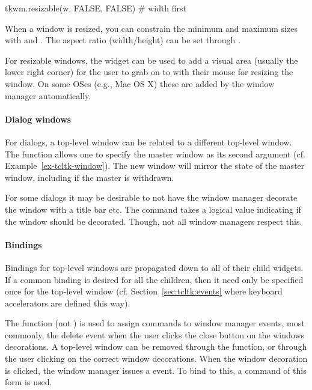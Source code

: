 \begin{Schunk}
  \begin{Sinput}
tkwm.resizable(w, FALSE, FALSE)    # width first
  \end{Sinput}
\end{Schunk}
%
When a window is resized, you can constrain the minimum and maximum
sizes with  and . The
aspect ratio (width/height) can be set through .


For resizable windows, the  widget can be
used to add a visual area (usually the lower right corner) for the
user to grab on to with their mouse for resizing the window. On some
OSes (e.g., Mac OS X) these are added by the window manager
automatically.


\paragraph{Dialog windows}
For dialogs, a top-level window can be related to
a different top-level window. The function 
allows one to specify the master window as its second
argument (cf. Example~\ref{ex-tcltk-window}). The
new window will mirror the state of the master window, including if
the master is withdrawn.

For some dialogs it may be desirable to not have the
window manager decorate the window with a title bar etc. The command
 takes a logical
value indicating if the window should be decorated. Though, not all
window managers respect this.



\paragraph{Bindings}
Bindings for top-level windows are propagated down to all of their
child widgets. If a common binding is desired for all the children,
then it need only be specified once for the top-level window
(cf. Section~\ref{sec:tcltk:events} where keyboard accelerators are
defined this way).


The  function (not ) is used
to assign commands to window manager events, most commonly, the delete
event when the user clicks the close button on the windows
decorations. A top-level window can be removed through the
 function, or through the user clicking on the
correct window decorations. When the window decoration is clicked, the
window manager issues a  event. To bind to
this, a command of this form
 is used.

